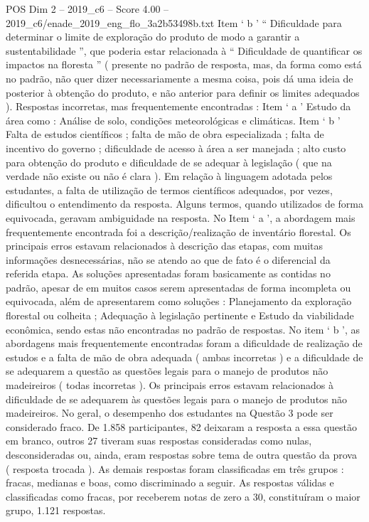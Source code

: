 \begin{textsample}{POS Dim 2 – 2019\_c6 – Score 4.00 – 2019\_c6/enade\_2019\_eng\_flo\_3a2b53498b.txt}
Item ‘ b ’ “ Dificuldade para determinar o limite de exploração do produto de modo a garantir a sustentabilidade ”, que poderia estar relacionada à “ Dificuldade de quantificar os impactos na floresta ” ( presente no padrão de resposta, mas, da forma como está no padrão, não quer dizer necessariamente a mesma coisa, pois dá uma ideia de posterior à obtenção do produto, e não anterior para definir os limites adequados ).
Respostas incorretas, mas frequentemente encontradas : Item ‘ a ’ Estudo da área como : Análise de solo, condições meteorológicas e climáticas.
Item ‘ b ’ Falta de estudos científicos ; falta de mão de obra especializada ; falta de incentivo do governo ; dificuldade de acesso à área a ser manejada ; alto custo para obtenção do produto e dificuldade de se adequar à legislação ( que na verdade não existe ou não é clara ).
Em relação à linguagem adotada pelos estudantes, a falta de utilização de termos científicos adequados, por vezes, dificultou o entendimento da resposta.
Alguns termos, quando utilizados de forma equivocada, geravam ambiguidade na resposta.
No Item ‘ a ’, a abordagem mais frequentemente encontrada foi a descrição/realização de inventário florestal.
Os principais erros estavam relacionados à descrição das etapas, com muitas informações desnecessárias, não se atendo ao que de fato é o diferencial da referida etapa.
As soluções apresentadas foram basicamente as contidas no padrão, apesar de em muitos casos serem apresentadas de forma incompleta ou equivocada, além de apresentarem como soluções : Planejamento da exploração florestal ou colheita ; Adequação à legislação pertinente e Estudo da viabilidade econômica, sendo estas não encontradas no padrão de respostas.
No item ‘ b ’, as abordagens mais frequentemente encontradas foram a dificuldade de realização de estudos e a falta de mão de obra adequada ( ambas incorretas ) e a dificuldade de se adequarem a questão as questões legais para o manejo de produtos não madeireiros ( todas incorretas ).
Os principais erros estavam relacionados à dificuldade de se adequarem às questões legais para o manejo de produtos não madeireiros.
No geral, o desempenho dos estudantes na Questão 3 pode ser considerado fraco.
De 1.858 participantes, 82 deixaram a resposta a essa questão em branco, outros 27 tiveram suas respostas consideradas como nulas, desconsideradas ou, ainda, eram respostas sobre tema de outra questão da prova ( resposta trocada ).
As demais respostas foram classificadas em três grupos : fracas, medianas e boas, como discriminado a seguir.
As respostas válidas e classificadas como fracas, por receberem notas de zero a 30, constituíram o maior grupo, 1.121 respostas.

\end{textsample}
